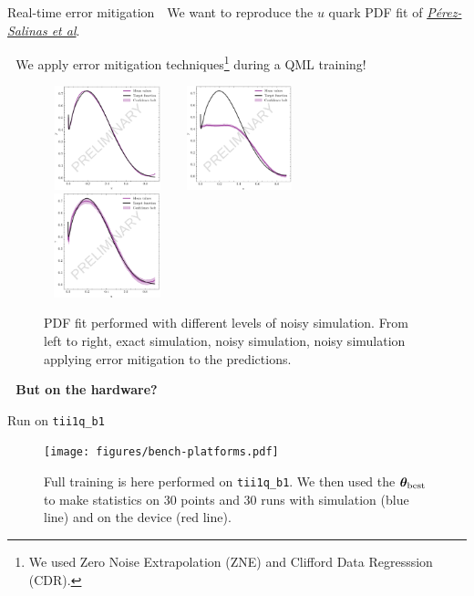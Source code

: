 \documentclass[8pt, xcolor={svgnames}, hyperref={colorlinks, linkcolor=black, citecolor=amethyst, urlcolor=amethyst}]{beamer}
\begin{document}
\begin{frame}{Real-time error mitigation \hfill \faTerminal}
\faArrowCircleRight\,\, We want to reproduce the $u$ quark PDF fit of \href{https://arxiv.org/abs/2011.13934}{\textit{Pérez-Salinas et al}}.

\pause
\faArrowCircleRight\,\, We apply error mitigation techniques\footnote{
    We used Zero Noise Extrapolation (ZNE) and Clifford Data Regresssion (CDR).
} during
a QML training! 
\pause
    \begin{figure}
    \includegraphics[height=3cm, width=0.33\textwidth]{figures/exact.pdf}%
    \includegraphics[height=3cm, width=0.33\textwidth]{figures/noisy.pdf}%
    \includegraphics[height=3cm, width=0.33\textwidth]{figures/mitigated.pdf}%
    \caption{PDF fit performed with different levels of noisy simulation. 
    From left to right, exact simulation, noisy simulation, noisy simulation 
    applying error mitigation to the predictions.}
    \end{figure}
\pause
\faArrowCircleRight\,\, \textbf{\textcolor{amethyst}{But on the hardware?}}
\end{frame}

\begin{frame}{Run on \texttt{tii1q\_b1} \hfill \faCogs}
\begin{figure}
    \texttt{[image: figures/bench-platforms.pdf]}
    \caption{Full training is here performed on \texttt{tii1q\_b1}. We then used 
    the $\bm{\theta}_{\rm best}$ to make statistics on 30 points and 30 runs with
    simulation (blue line) and on the device (red line).} 
\end{figure}
\end{frame}
\end{document}
